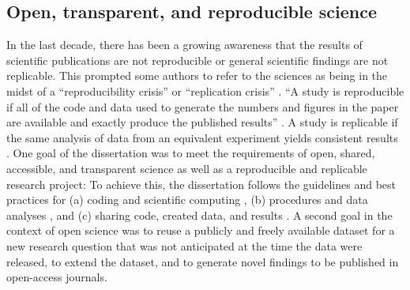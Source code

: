 \subsection{Open, transparent, and reproducible science}


In the last decade, there has been a growing awareness that the results of
scientific publications are not reproducible or general scientific findings are
not replicable.
%
This prompted some authors to refer to the sciences as being in the midst of a
``reproducibility crisis'' or ``replication crisis''
\citep{baker2016reproducibility, plesser2018reproducibility,
stupple2019reproducibility, nosek2022replicability}.
``A study is reproducible if all of the code and data used to generate the
numbers and figures in the paper are available and exactly produce the published
results'' \citep[][p. 111]{leek2017most}.
A study is replicable if the same analysis of data from an equivalent experiment
yields consistent results \citep{dubois2016building, leek2017most}.
%
One goal of the dissertation was to meet the requirements of open, shared,
accessible, and transparent science \citep[cf.][]{watson2015will,
fecher2014open} as well as a reproducible and replicable research project:
%
To achieve this, the dissertation follows the guidelines and best practices for
(a) coding and scientific computing \citep{wilson2014best}, (b) procedures and
data analyses \citep{nichols2017best, poldrack2017scanning,
poldrack2019establishment}, and (c) sharing code, created data, and results
\citep{eglen2017toward, nichols2017best, pernet2015improving}.
A second goal in the context of open science was to reuse a publicly and freely
available dataset for a new research question that was not anticipated at the
time the data were released, to extend the dataset, and to generate novel
findings to be published in open-access journals.

